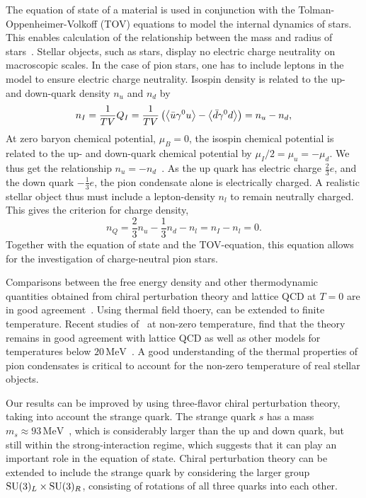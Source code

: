 The equation of state of a material is used in conjunction with the Tolman-Oppenheimer-Volkoff (TOV) equations to model the internal dynamics of stars.
This enables calculation of the relationship between the mass and radius of stars~\cite{Carroll:space-time}.
Stellar objects, such as stars, display no electric charge neutrality on macroscopic scales.
In the case of pion stars, one has to include leptons in the model to ensure electric charge neutrality.
Isospin density is related to the up- and down-quark density $n_u$ and $n_d$ by
\begin{equation}
    n_I 
    = \frac{1}{TV} Q_I 
    = \frac{1}{TV} \left(\ex{\bar u \gamma^0 u} - \ex{\bar d \gamma^0 d} \right) 
    = n_u - n_d,
\end{equation}
At zero baryon chemical potential, $\mu_B = 0$, the isospin chemical potential is related to the up- and down-quark chemical potential by $\mu_I/2 = \mu_u = -\mu_d$.
We thus get the relationship $n_u = -n_d$~\cite{new_clas_of_compact_stars}.
As the up quark has electric charge $\frac{2}{3}e$, and the down quark $-\frac{1}{3}e$, the pion condensate alone is electrically charged.
A realistic stellar object thus must include a lepton-density $n_l$ to remain neutrally charged.
This gives the criterion for charge density,
\begin{equation}
    n_Q = \frac{2}{3}n_u - \frac{1}{3} n_d - n_l = n_I - n_l = 0.
\end{equation}
Together with the equation of state and the TOV-equation, this equation allows for the investigation of charge-neutral pion stars.

Comparisons between the free energy density and other thermodynamic quantities obtained from chiral perturbation theory and lattice QCD at $T = 0$ are in good agreement~\cite{Andersen:two-flavor-chpt,mojahed}.
Using thermal field thoery, \chpt can be extended to finite temperature.
Recent studies of \chpt\, at non-zero temperature, find that the theory remains in good agreement with lattice QCD as well as other models for temperatures below $20 \, \text{MeV}$~\cite{andersen_mojahed:condensates_and_pressure}.
A good understanding of the thermal properties of pion condensates is critical to account for the non-zero temperature of real stellar objects.

Our results can be improved by using three-flavor chiral perturbation theory, taking into account the strange quark.
The strange quark $s$ has a mass $m_s \approx 93 \, \text{MeV}$~\cite{PDG}, which is considerably larger than the up and down quark, but still within the strong-interaction regime, which suggests that it can play an important role in the equation of state.
Chiral perturbation theory can be extended to include the strange quark by considering the larger group $\mathrm{SU}(3)_L \times \mathrm{SU}(3)_R$, consisting of rotations of all three quarks into each other.
